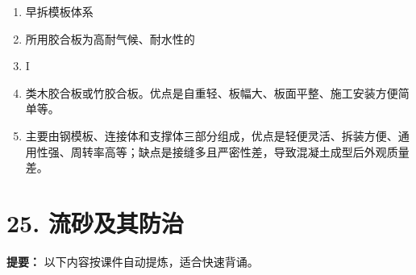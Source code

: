 \documentclass[UTF8,fontset=fandol,11pt]{ctexart}
\begin{document}
\begin{enumerate}[label=\arabic*.]
\item 早拆模板体系

\item 所用胶合板为高耐气候、耐水性的

\item I

\item 类木胶合板或竹胶合板。优点是自重轻、板幅大、板面平整、施工安装方便简单等。

\item 主要由钢模板、连接体和支撑体三部分组成，优点是轻便灵活、拆装方便、通用性强、周转率高等；缺点是接缝多且严密性差，导致混凝土成型后外观质量差。

\end{enumerate}

\newpage

\section*{25. 流砂及其防治}


\begin{mainbox}

\textbf{提要：} 以下内容按课件自动提炼，适合快速背诵。

\end{mainbox}
\end{document}

